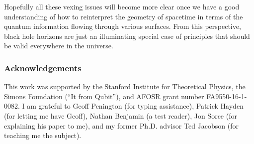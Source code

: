 \documentclass[12pt]{article}
\begin{document}
Hopefully all these vexing issues will become more clear once we have a good understanding of how to reinterpret the geometry of spacetime in terms of the quantum information flowing through various surfaces.  From this perspective, black hole horizons are just an illuminating special case of principles that should be valid everywhere in the universe.

\subsubsection*{Acknowledgements}
{\small
This work was supported by the Stanford Institute for Theoretical Physics, the Simons Foundation (``It from Qubit''), and AFOSR grant number FA9550-16-1-0082.  I am grateful to Geoff Penington (for typing assistance), Patrick Hayden (for letting me have Geoff), Nathan Benjamin (a test reader), Jon Sorce (for explaining his paper to me), and my former Ph.D. advisor Ted Jacobson (for teaching me the subject).  
}



\end{document}
